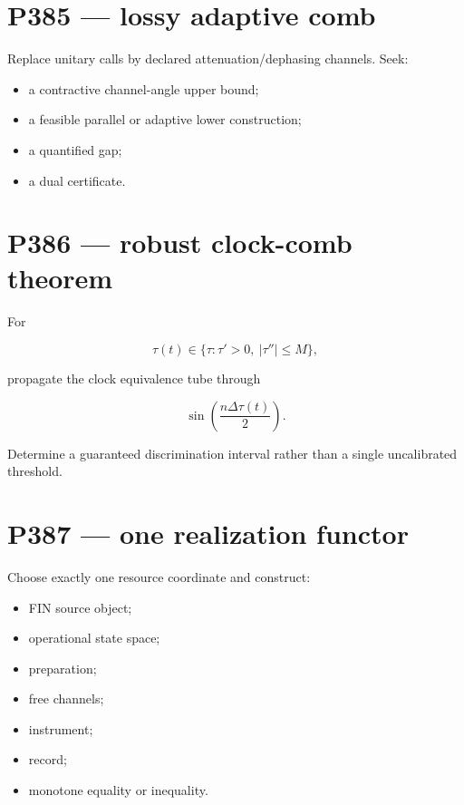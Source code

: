 \documentclass[11pt,a4paper,openany]{report}
\begin{document}
\section{P385 --- lossy adaptive comb}

Replace unitary calls by declared attenuation/\allowbreak{}dephasing channels. Seek:

\begin{itemize}
\item 
a contractive channel-angle upper bound;

\item 
a feasible parallel or adaptive lower construction;

\item 
a quantified gap;

\item 
a dual certificate.

\end{itemize}

\section{P386 --- robust clock-comb theorem}

For

\[
\tau(t)\in
\{\tau:\tau'>0,\ |\tau''|\leq M\},
\]

propagate the clock equivalence tube through

\[
\sin\!\left(\frac{n\Delta\tau(t)}{2}\right).
\]

Determine a guaranteed discrimination interval rather than a single uncalibrated threshold.

\section{P387 --- one realization functor}

Choose exactly one resource coordinate and construct:

\begin{itemize}
\item 
FIN source object;

\item 
operational state space;

\item 
preparation;

\item 
free channels;

\item 
instrument;

\item 
record;

\item 
monotone equality or inequality.

\end{itemize}
\end{document}
